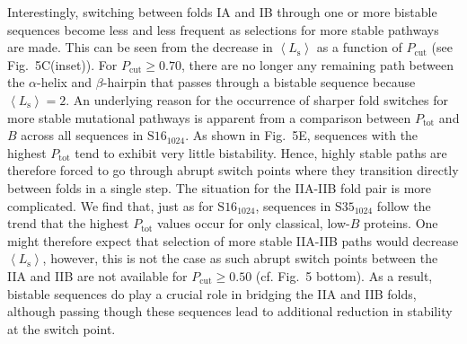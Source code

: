 \documentclass[
aip,
rsi,%
amsmath,amssymb,
reprint,%
]{revtex4-1}
\newcommand {\Pcut}     	{{P_\mathrm{cut}}}
\newcommand {\Ptot}	{{P_\mathrm{tot}}}
\newcommand {\SI}		{${\mathrm{S16}_{1024}}$}
\newcommand {\SII}		{${\mathrm{S35}_{1024}}$}
\begin{document}
Interestingly, switching between folds IA and IB through one or more bistable sequences become less and less frequent as selections for more stable pathways are made. This can be seen from the decrease in $\left <L_\mathrm{s}\right >$ as a function of $\Pcut$ (see Fig.~5C(inset)). For $\Pcut\ge0.70$, there are no longer any remaining path between the $\alpha$-helix and $\beta$-hairpin that passes through a bistable sequence because $\left <L_\mathrm{s}\right > =  2$. An underlying reason for the occurrence of sharper fold switches for more stable mutational pathways is apparent from a comparison between $\Ptot$ and $B$ across all sequences in {\SI}. As shown in Fig.~5E, sequences with the highest $\Ptot$ tend to exhibit very little bistability. Hence, highly stable paths are therefore forced to go through abrupt switch points where they transition directly between folds in a single step. The situation for the IIA-IIB fold pair is more complicated. We find that, just as for {\SI}, sequences in {\SII} follow the trend that the highest $\Ptot$ values occur for only classical, low-$B$ proteins. One might therefore expect that selection of more stable IIA-IIB paths would decrease $\left <L_\mathrm{s}\right >$, however, this is not the case as such abrupt switch points between the IIA and IIB are not available for $\Pcut\ge0.50$ (cf. Fig.~5 bottom). As a result, bistable sequences do play a crucial role in bridging the IIA and IIB folds, although passing though these sequences lead to additional reduction in stability at the switch point. 

 

%
%
 
\end{document}
